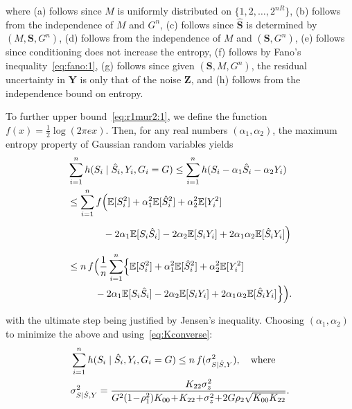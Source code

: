 \documentclass[journal]{IEEEtran}
\def\bS{\mathbf S}
\def\bY{\mathbf Y}
\def\bhS{\hat{\mathbf S}}
\def\bZ{\mathbf Z}
\def\bhS{\hat{\mathbf S}}
\begin{document}
\noindent where (a) follows since $M$ is uniformly distributed on $\{1,2,\ldots,2^{nR}\}$, (b) follows from the independence of $M$ and $G^n$, (c) follows since $\bhS$ is determined by $(M,\bS,G^n)$, (d) follows from the independence of $M$ and $(\bS,G^n)$, (e) follows since conditioning does not increase the entropy, (f) follows by Fano's inequality~\eqref{eq:fano:1}, (g) follows since given $(\bS,M,G^n)$, the residual uncertainty in $\bY$ is only that of the noise $\bZ$, and (h) follows from the independence bound on entropy.

To further upper bound~\eqref{eq:r1mur2:1}, we define the function $f(x) = \tfrac{1}{2}\log(2\pi e x)$. 
Then, for any real numbers $(\alpha_1, \alpha_2)$, the maximum entropy property of Gaussian random variables yields
\begin{align*}
    &\sum_{i=1}^n h(S_i \mid \hat{S}_i, Y_i, G_i = G) 
    \leq \sum_{i=1}^n h(S_i - \alpha_1 \hat{S}_i - \alpha_2 Y_i) \notag\\
    &\leq \sum_{i=1}^n 
    f\Bigl(
        \mathbb{E}[S_i^2] 
        + \alpha_1^2 \mathbb{E}[\hat{S}_i^2]
        + \alpha_2^2 \mathbb{E}[Y_i^2] \notag\\
    &\phantom{\leq \sum_{i=1}^n f(}
        - 2\alpha_1 \mathbb{E}[S_i \hat{S}_i]
        - 2\alpha_2 \mathbb{E}[S_i Y_i]
        + 2\alpha_1 \alpha_2 \mathbb{E}[\hat{S}_i Y_i]
    \Bigr) \notag\\
    &\leq n\, f\Bigl(
        \frac{1}{n} \sum_{i=1}^n 
        \Bigl\{
            \mathbb{E}[S_i^2]
            + \alpha_1^2 \mathbb{E}[\hat{S}_i^2]
            + \alpha_2^2 \mathbb{E}[Y_i^2] \notag\\
    &\phantom{\leq n\, f(}
            - 2\alpha_1 \mathbb{E}[S_i \hat{S}_i]
            - 2\alpha_2 \mathbb{E}[S_i Y_i]
            + 2\alpha_1 \alpha_2 \mathbb{E}[\hat{S}_i Y_i]
        \Bigr\}
    \Bigr).
\end{align*}


\noindent with the ultimate step being justified by Jensen's inequality. Choosing $(\alpha_1, \alpha_2)$ to minimize the above and using~\eqref{eq:Kconverse}:
\begin{align}
    &\sum_{i=1}^n h(S_i \mid \hat{S}_i, Y_i, G_i = G) 
    \leq n\, f(\sigma_{S|\hat{S},Y}^2), 
    \quad \text{where} \label{eq:r1mur2:2}\\
    &\sigma_{S|\hat{S},Y}^2 
    = \frac{K_{22} \sigma_z^2}{
        G^2 (1 \!-\! \rho_1^2) K_{00} 
        \!+\! K_{22} 
        \!+\! \sigma_z^2 
        \!+\! 2G \rho_2 \sqrt{K_{00} K_{22}}
    }. \notag
\end{align}
\end{document}
